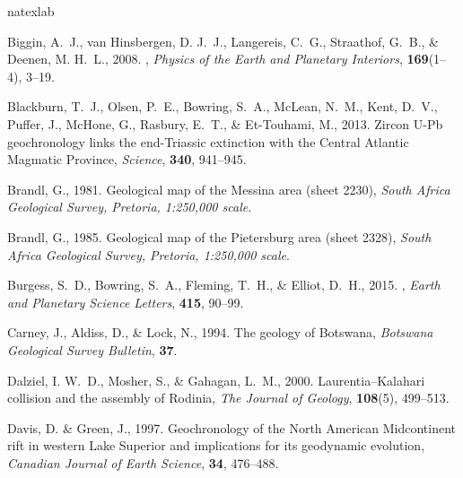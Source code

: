 \documentclass[11pt,letterpaper]{article}
\begin{document}
\singlespacing

\begin{thebibliography}{49}
\expandafter\ifx\csname natexlab\endcsname\relax\def\natexlab#1{#1}\fi

Biggin, A.~J., van Hinsbergen, D. J.~J., Langereis, C.~G., Straathof, G.~B., \&
  Deenen, M. H.~L., 2008.
, {\it Physics of the Earth and Planetary Interiors\/},
  {\bf 169}(1--4), 3--19.

Blackburn, T.~J., Olsen, P.~E., Bowring, S.~A., McLean, N.~M., Kent, D.~V.,
  Puffer, J., McHone, G., Rasbury, E.~T., \& Et-Touhami, M., 2013.
\newblock Zircon {U-Pb} geochronology links the end-{T}riassic extinction with
  the {Central Atlantic Magmatic Province}, {\it Science\/}, {\bf 340},
  941--945.

Brandl, G., 1981.
\newblock Geological map of the {M}essina area (sheet 2230), {\it South Africa
  Geological Survey, Pretoria, 1:250,000 scale\/}.

Brandl, G., 1985.
\newblock Geological map of the {P}ietersburg area (sheet 2328), {\it South
  Africa Geological Survey, Pretoria, 1:250,000 scale\/}.

Burgess, S.~D., Bowring, S.~A., Fleming, T.~H., \& Elliot, D.~H., 2015.
, {\it Earth and Planetary
  Science Letters\/}, {\bf 415}, 90--99.

Carney, J., Aldiss, D., \& Lock, N., 1994.
\newblock The geology of {B}otswana, {\it Botswana Geological Survey
  Bulletin\/}, {\bf 37}.

Dalziel, I. W.~D., Mosher, S., \& Gahagan, L.~M., 2000.
\newblock Laurentia--{K}alahari collision and the assembly of {R}odinia, {\it
  The Journal of Geology\/}, {\bf 108}(5), 499--513.

Davis, D. \& Green, J., 1997.
\newblock Geochronology of the {N}orth {A}merican {M}idcontinent rift in
  western {L}ake {S}uperior and implications for its geodynamic evolution, {\it
  Canadian Journal of Earth Science\/}, {\bf 34}, 476--488.


\end{thebibliography}
\end{document}
